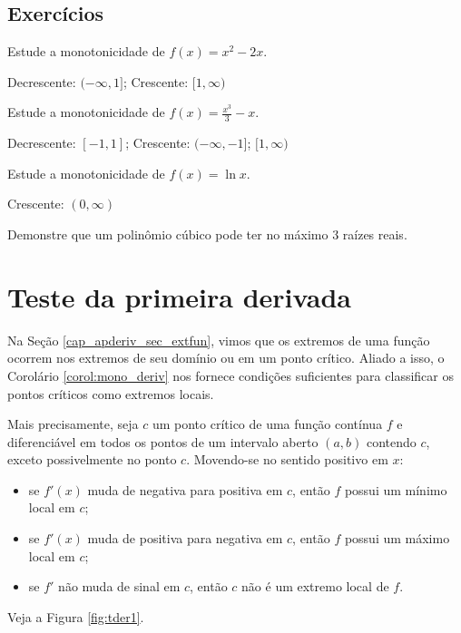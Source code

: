 \subsection*{Exercícios}

\begin{exer}
  Estude a monotonicidade de $f(x) = x^2 - 2x$.
\end{exer}
\begin{resp}
  Decrescente: $(-\infty, 1]$; Crescente: $[1, \infty)$
\end{resp}

\begin{exer}
  Estude a monotonicidade de $\displaystyle f(x) = \frac{x^3}{3}-x$.
\end{exer}
\begin{resp}
  Decrescente: $[-1, 1]$; Crescente: $(-\infty, -1]$; $[1, \infty)$
\end{resp}

\begin{exer}
  Estude a monotonicidade de $\displaystyle f(x) = \ln x$.
\end{exer}
\begin{resp}
  Crescente: $(0, \infty)$
\end{resp}


\begin{exer}
  Demonstre que um polinômio cúbico pode ter no máximo $3$ raízes reais.
\end{exer}

\section{Teste da primeira derivada}\label{cap_apderiv_sec_tder1}

Na Seção \ref{cap_apderiv_sec_extfun}, vimos que os extremos de uma função ocorrem nos extremos de seu domínio ou em um ponto crítico. Aliado a isso, o Corolário \ref{corol:mono_deriv} nos fornece condições suficientes para classificar os pontos críticos como extremos locais.

Mais precisamente, seja $c$ um ponto crítico de uma função contínua $f$ e diferenciável em todos os pontos de um intervalo aberto $(a, b)$ contendo $c$, exceto possivelmente no ponto $c$. Movendo-se no sentido positivo em $x$:
\begin{itemize}
\item se $f'(x)$ muda de negativa para positiva em $c$, então $f$ possui um mínimo local em $c$;
\item se $f'(x)$ muda de positiva para negativa em $c$, então $f$ possui um máximo local em $c$;
\item se $f'$ não muda de sinal em $c$, então $c$ não é um extremo local de $f$.
\end{itemize}
Veja a Figura \ref{fig:tder1}.

